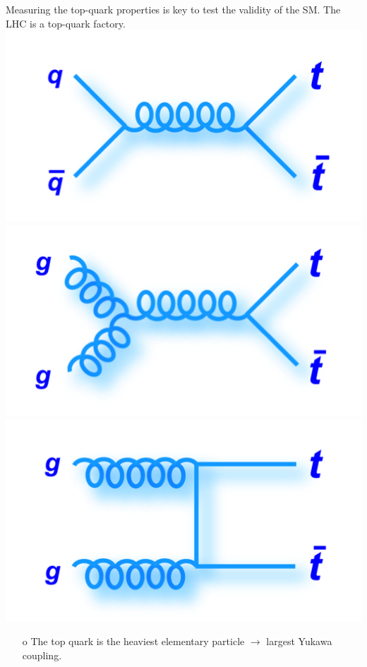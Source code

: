 \begin{frame}{Measuring the top-quark properties is key to test the validity of the SM. The LHC is a top-quark factory.}
\centering
\includegraphics[height=0.25\textheight]{./plots/ttbar_1.png}
\includegraphics[height=0.25\textheight]{./plots/ttbar_2.png}
\includegraphics[height=0.25\textheight]{./plots/ttbar_3.png}
\begin{enumerate}
\item[o] The top quark is the heaviest elementary particle $\rightarrow$ largest Yukawa coupling.

\end{enumerate}
\end{frame}
